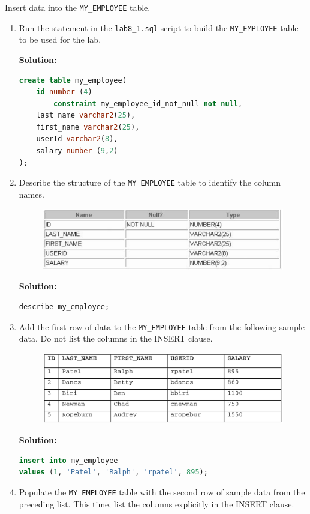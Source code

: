 Insert data into the \texttt{MY\_EMPLOYEE} table.
\begin{enumerate}
    \item Run the statement in the \texttt{lab8\_1.sql} script to build the \texttt{MY\_EMPLOYEE} table to be used for the lab.
    
    \textbf{Solution: }
    \begin{lstlisting}[language=SQL]
create table my_employee(
    id number (4) 
        constraint my_employee_id_not_null not null,
    last_name varchar2(25),
    first_name varchar2(25),
    userId varchar2(8),
    salary number (9,2)
);
    \end{lstlisting}
    \item Describe the structure of the \texttt{MY\_EMPLOYEE} table to identify the column names. 
    \begin{figure}[h]
        \centering
        \includegraphics[width=0.7\linewidth]{graphics/82.png}
    \end{figure}
    
    \textbf{Solution: }
    \begin{lstlisting}[language=SQL]
describe my_employee;
    \end{lstlisting}
    \item  Add the first row of data to the \texttt{MY\_EMPLOYEE} table from the following sample data. Do not list the
columns in the INSERT clause.   
    \begin{figure}[h]
        \centering
        \includegraphics[width=0.7\linewidth]{graphics/83.png}
    \end{figure}

    \textbf{Solution: }
    \begin{lstlisting}[language=SQL]
insert into my_employee
values (1, 'Patel', 'Ralph', 'rpatel', 895);
    \end{lstlisting}
    \item  Populate the \texttt{MY\_EMPLOYEE} table with the second row of sample data from the preceding list. This
time, list the columns explicitly in the INSERT clause.  
    

\end{enumerate}
